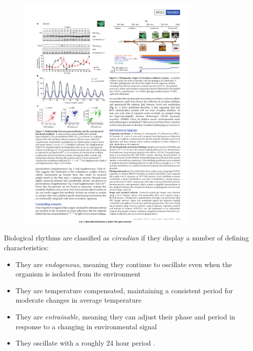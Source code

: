 \begin{figure}[p]
  \centering
\includegraphics[width=0.8\textwidth]{chap1/figures/edgar_ros.pdf}
  \label{fig:edgarros}
\end{figure}

Biological rhythms are classified as {\em circadian} if they display a number of defining characteristics:
\begin{itemize}
  \item They are {\em endogenous}, meaning they continue to oscillate even when the organism is isolated from its environment

  \item They are temperature compensated, maintaining a consistent period for moderate changes in average temperature

  \item They are {\em entrainable}, meaning they can adjust their phase and period in response to a changing in environmental signal

  \item They oscillate with a roughly 24 hour period \cite{Dunlap2009}.
\end{itemize}

